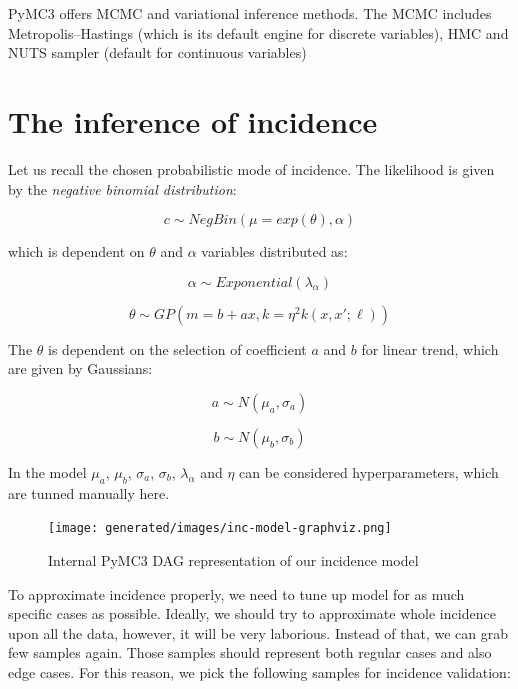 \documentclass[
  digital, %
  oneside, %
  lof,     %
  lot,     %
]{fithesis4}
\begin{document}
PyMC3 offers MCMC and variational inference methods.
The MCMC includes Metropolis–Hastings (which is its default 
engine for discrete variables), HMC and NUTS sampler (default 
for continuous variables)


\section{The inference of incidence}

Let us recall the chosen probabilistic mode of incidence.
The likelihood is given by the \textit{negative binomial distribution}:

\begin{equation}
  c \sim NegBin(\mu=exp(\theta), \alpha)
\end{equation}

which is dependent on $\theta$ and $\alpha$ variables distributed as:

\begin{equation}
  \alpha \sim Exponential(\lambda_\alpha)
\end{equation}

\begin{equation}
  \theta \sim GP(m=b + ax, k=\eta^2 k \left( x, x'; \ell \right))
\end{equation}

The $\theta$ is dependent on the selection of 
coefficient $a$ and $b$ for linear trend, which are 
given by Gaussians:

\begin{equation}
  a \sim N(\mu_a, \sigma_a)
\end{equation}

\begin{equation}
  b \sim N(\mu_b, \sigma_b)
\end{equation}

In the model $\mu_a$, $\mu_b$, $\sigma_a$, $\sigma_b$, 
$\lambda_\alpha$ and $\eta$ can be 
considered hyperparameters, which are tunned manually here.

\begin{figure}[h]
  \begin{center}
    \texttt{[image: generated/images/inc-model-graphviz.png]}
  \end{center}
  \caption{Internal PyMC3 DAG representation of our incidence model}
  \label{fig:inc-model-graphviz}
\end{figure}

To approximate incidence properly, we need to tune up model for
as much specific cases as possible. Ideally, we should try to approximate
whole incidence upon all the data, however, it will be very laborious.
Instead of that, we can grab few samples again. Those samples should
represent both regular cases and also edge cases.
For this reason, we pick the following samples for incidence validation:
\end{document}
